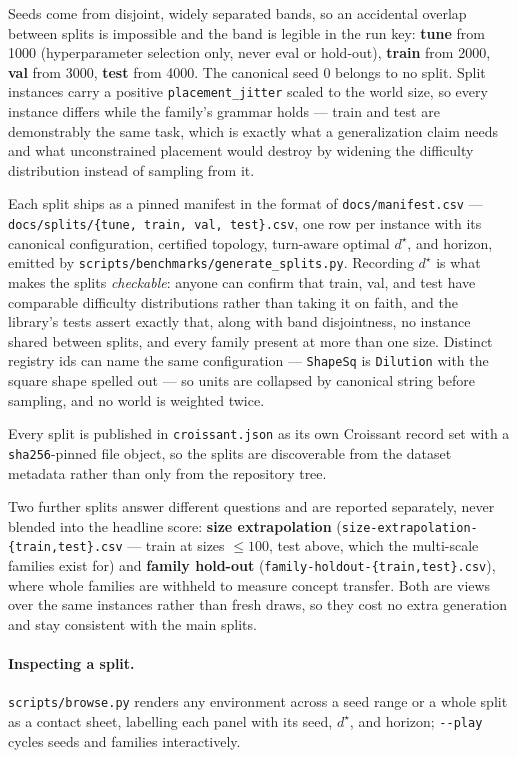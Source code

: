\documentclass[11pt]{article}
\begin{document}
Seeds come from disjoint, widely separated bands, so an accidental
overlap between splits is impossible and the band is legible in the
run key: \textbf{tune} from 1000 (hyperparameter selection only,
never eval or hold-out), \textbf{train} from 2000, \textbf{val} from
3000, \textbf{test} from 4000. The canonical seed 0 belongs to no
split. Split instances carry a positive
\texttt{placement\_jitter} scaled to the world size, so every
instance differs while the family's grammar holds --- train and test
are demonstrably the same task, which is exactly what a
generalization claim needs and what unconstrained placement would
destroy by widening the difficulty distribution instead of sampling
from it.

Each split ships as a pinned manifest in the format of
\texttt{docs/manifest.csv} --- \texttt{docs/splits/\{tune, train,
val, test\}.csv}, one row per instance with its canonical
configuration, certified topology, turn-aware optimal $d^{\star}$,
and horizon, emitted by \texttt{scripts/benchmarks/generate\_splits.py}.
Recording $d^{\star}$ is what makes the splits \emph{checkable}:
anyone can confirm that train, val, and test have comparable
difficulty distributions rather than taking it on faith, and the
library's tests assert exactly that, along with band disjointness, no
instance shared between splits, and every family present at more than
one size. Distinct registry ids can name the same configuration ---
\texttt{ShapeSq} is \texttt{Dilution} with the square shape spelled
out --- so units are collapsed by canonical string before sampling,
and no world is weighted twice.

Every split is published in \texttt{croissant.json} as its own
Croissant record set with a \texttt{sha256}-pinned file object, so
the splits are discoverable from the dataset metadata rather than
only from the repository tree.

Two further splits answer different questions and are reported
separately, never blended into the headline score: \textbf{size
extrapolation} (\texttt{size-extrapolation-\{train,test\}.csv} ---
train at sizes $\le 100$, test above, which the multi-scale families
exist for) and \textbf{family hold-out}
(\texttt{family-holdout-\{train,test\}.csv}), where whole families
are withheld to measure concept transfer. Both are views over the
same instances rather than fresh draws, so they cost no extra
generation and stay consistent with the main splits.

\paragraph{Inspecting a split.} \texttt{scripts/browse.py} renders
any environment across a seed range or a whole split as a contact
sheet, labelling each panel with its seed, $d^{\star}$, and horizon;
\texttt{-{}-play} cycles seeds and families interactively.
\end{document}
